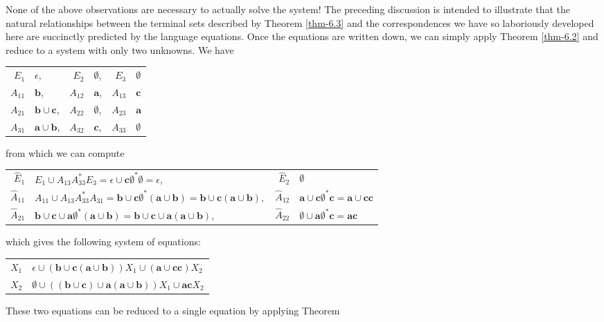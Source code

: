 None of the above observations are necessary to actually solve the system! The
preceding discussion is intended to illustrate that the natural relationships
between the terminal sets described by Theorem \ref{thm-6.3} and the correspondences we
have so laboriously developed here are succinctly predicted by the language
equations. Once the equations are written down, we can simply apply Theorem \ref{thm-6.2}
and reduce to a system with only two unknowns. We have
\begin{center}\begin{tabular}{r@{ = }l@{$\qquad$}r@{ = }l@{$\qquad$}r@{ = }l}
$E_1$ & $\epsilon$, & $E_2$ & $\emptyset$, & $E_3$ & $\emptyset$ \\
$A_{11}$ & $\pmb{b}$, & $A_{12}$ & $\pmb{a}$, & $A_{13}$ & $\pmb{c}$ \\
$A_{21}$ & $\pmb{b}\cup\pmb{c}$, & $A_{22}$ & $\emptyset$, & $A_{23}$ &
	$\pmb{a}$ \\
$A_{31}$ & $\pmb{a}\cup\pmb{b}$, & $A_{32}$ & $\pmb{c}$, & $A_{33}$ &
	$\emptyset$
\end{tabular}\end{center}
from which we can compute
\begin{center}\begin{tabular}{r@{ = }l@{$\qquad$}r@{ = }l}
$\hat{E}_1$ & $E_1 \cup A_{13}A^*_{33}E_3 = \epsilon\cup \pmb{c}\emptyset^*
	\emptyset = \epsilon,$ & $\hat{E}_2$ & $\emptyset$ \\
$\hat{A}_{11}$ & $A_{11} \cup A_{13}A^*_{33}A_{31} = \pmb{b} \cup \pmb{c}
	\emptyset^*(\pmb{a}\cup\pmb{b}) = \pmb{b}\cup\pmb{c}(\pmb{a}\cup\pmb{b}),$
	& $\hat{A}_{12}$ & $\pmb{a}\cup\pmb{c}\emptyset^*\pmb{c} = \pmb{a}\cup
	\pmb{cc}$ \\
$\hat{A}_{21}$ & $\pmb{b}\cup\pmb{c}\cup\pmb{a}\emptyset^*(\pmb{a}\cup\pmb{b}) =
	\pmb{b}\cup\pmb{c}\cup\pmb{a}(\pmb{a}\cup\pmb{b}),$ & $\hat{A}_{22}$ &
	$\emptyset\cup\pmb{a}\emptyset^*\pmb{c} = \pmb{ac}$
\end{tabular}\end{center}
which gives the following system of equations:
\begin{center}\begin{tabular}{r@{ = }l}
$X_1$ & $\epsilon\cup(\pmb{b}\cup\pmb{c}(\pmb{a}\cup\pmb{b}))X_1\cup(\pmb{a}\cup
	\pmb{cc})X_2$ \\
$X_2$ & $\emptyset\cup((\pmb{b}\cup\pmb{c})\cup\pmb{a}(\pmb{a}\cup\pmb{b}))X_1
	\cup\pmb{ac}X_2$
\end{tabular}\end{center}
These two equations can be reduced to a single equation by applying Theorem
